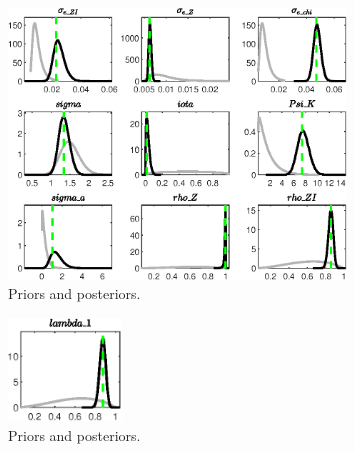  
\begin{figure}[H]
\centering
\includegraphics[width=0.80\textwidth]{two_sector_RBC_mobile/Output/two_sector_RBC_mobile_PriorsAndPosteriors1}
\caption{Priors and posteriors.}\label{Fig:PriorsAndPosteriors:1}
\end{figure}
 
\begin{figure}[H]
\centering
\includegraphics[width=0.27\textwidth]{two_sector_RBC_mobile/Output/two_sector_RBC_mobile_PriorsAndPosteriors2}
\caption{Priors and posteriors.}\label{Fig:PriorsAndPosteriors:2}
\end{figure}
 
